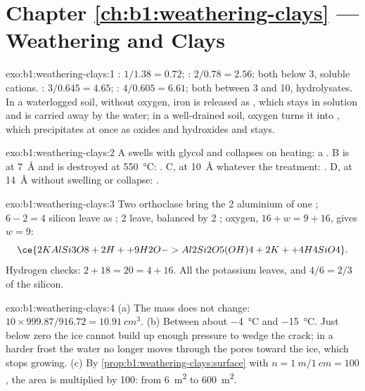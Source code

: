 \section*{Chapter \ref{ch:b1:weathering-clays} --- Weathering and Clays}

\begin{solution}{exo:b1:weathering-clays:1}
: $1/1.38 = 0.72$; : $2/0.78 = 2.56$; both below 3, soluble
cations. : $3/0.645 = 4.65$; : $4/0.605 = 6.61$; both
between 3 and 10, hydrolysates. In a waterlogged soil, without oxygen, iron is
released as , which stays in solution and is carried away by the
water; in a well-drained soil, oxygen turns it into , which
precipitates at once as oxides and hydroxides and stays.
\end{solution}

\begin{solution}{exo:b1:weathering-clays:2}
A swells with glycol and collapses on heating: a . B is at
\SI{7}{\angstrom} and is destroyed at \SI{550}{\celsius}: . C, at
\SI{10}{\angstrom} whatever the treatment: . D, at \SI{14}{\angstrom}
without swelling or collapse: .
\end{solution}

\begin{solution}{exo:b1:weathering-clays:3}
Two orthoclase bring the 2 aluminium of one ; $6 - 2 = 4$ silicon
leave as ; 2  leave, balanced by 2 ; oxygen,
$16 + w = 9 + 16$, gives $w = 9$:
\[
  \ce{2 KAlSi3O8 + 2 H+ + 9 H2O -> Al2Si2O5(OH)4 + 2 K+ + 4 H4SiO4}.
\]
Hydrogen checks: $2 + 18 = 20 = 4 + 16$. All the potassium leaves, and $4/6 =
2/3$ of the silicon.
\end{solution}

\begin{solution}{exo:b1:weathering-clays:4}
(a) The mass does not change: $10 \times 999.87/916.72 = \qty{10.91}{cm^3}$.
(b) Between about \qty{-4}{\celsius} and \qty{-15}{\celsius}. Just below zero
the ice cannot build up enough pressure to wedge the crack; in a harder frost
the water no longer moves through the pores toward the ice, which stops
growing. (c) By
\cref{prop:b1:weathering-clays:surface} with $n = \qty{1}{m}/\qty{1}{cm} = 100$,
the area is multiplied by 100: from \qty{6}{m^2} to \qty{600}{m^2}.
\end{solution}

